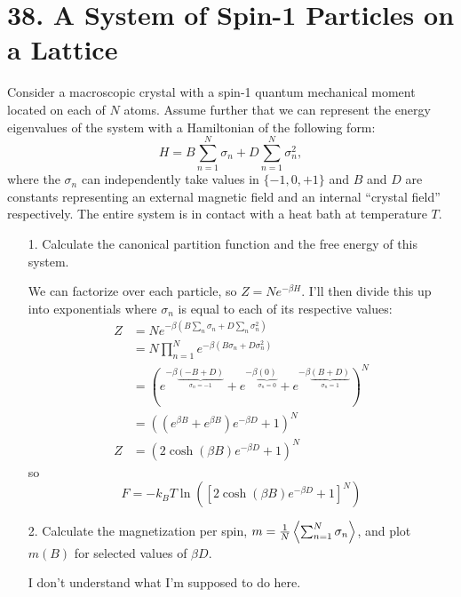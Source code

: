 \documentclass[a4paper,twoside]{article}
\begin{document}
\section*{38. A System of Spin-1 Particles on a Lattice}
Consider a macroscopic crystal with a spin-1 quantum mechanical moment located on each of $ N $ atoms. Assume further that we can represent the energy eigenvalues of the system with a Hamiltonian of the following form:
\begin{equation}
    H = B \sum_{n=1}^{N} \sigma_n + D \sum_{n=1}^{N} \sigma^2_n,
\end{equation}
where the $ \sigma_n $ can independently take values in $ \{-1, 0, +1\} $ and $ B $ and $ D $ are constants representing an external magnetic field and an internal ``crystal field'' respectively. The entire system is in contact with a heat bath at temperature $ T $.
\begin{itemize}
    \item[1.] Calculate the canonical partition function and the free energy of this system.
        \begin{problem}
            We can factorize over each particle, so $ Z = N e^{- \beta H} $. I'll then divide this up into exponentials where $ \sigma_n $ is equal to each of its respective values:
            \begin{align}
                Z &= N e^{- \beta \left( B \sum_n \sigma_n + D \sum_n \sigma^2_n \right)} \\
                &= N \prod_{n=1}^{N} e^{- \beta (B \sigma_n + D \sigma_n^2)} \\
                &= \left( e^{- \beta \underbrace{(-B + D)}_{\sigma_n = -1}} + e^{- \beta \underbrace{(0)}_{\sigma_n = 0}} + e^{- \beta \underbrace{(B + D)}_{\sigma_n = 1}} \right)^{N} \\
                &= \left( \left( e^{\beta B} + e^{\beta B} \right) e^{- \beta D} + 1 \right)^N \\
                Z &= \left( 2 \cosh(\beta B) e^{- \beta D} + 1 \right)^N
            \end{align}
            so
            \begin{equation}
                F = - k_B T \ln(\left[ 2 \cosh(\beta B) e^{- \beta D} + 1 \right]^N)
            \end{equation}
        \end{problem}
    \item[2.] Calculate the magnetization per spin, $ m = \frac{1}{N} \ev{\sum_{n=1}^{N} \sigma_n} $, and plot $ m(B) $ for selected values of $ \beta D $.
        \begin{problem}
            I don't understand what I'm supposed to do here.
        \end{problem}
\end{itemize}
\end{document}
